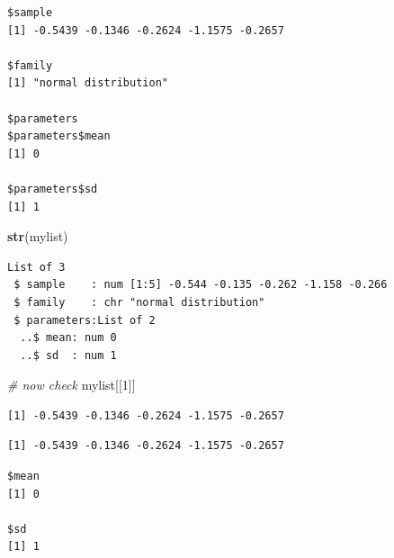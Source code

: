 \documentclass[
]{book}
\newenvironment{Shaded}{\begin{snugshade}}{\end{snugshade}}
\newcommand{\CommentTok}[1]{\textcolor[rgb]{0.56,0.35,0.01}{\textit{#1}}}
\newcommand{\DecValTok}[1]{\textcolor[rgb]{0.00,0.00,0.81}{#1}}
\newcommand{\KeywordTok}[1]{\textcolor[rgb]{0.13,0.29,0.53}{\textbf{#1}}}
\newcommand{\NormalTok}[1]{#1}
\newcommand{\OperatorTok}[1]{\textcolor[rgb]{0.81,0.36,0.00}{\textbf{#1}}}
\begin{document}
\begin{verbatim}
$sample
[1] -0.5439 -0.1346 -0.2624 -1.1575 -0.2657

$family
[1] "normal distribution"

$parameters
$parameters$mean
[1] 0

$parameters$sd
[1] 1
\end{verbatim}

\begin{Shaded}
\begin{Highlighting}[]
\KeywordTok{str}\NormalTok{(mylist)}
\end{Highlighting}
\end{Shaded}

\begin{verbatim}
List of 3
 $ sample    : num [1:5] -0.544 -0.135 -0.262 -1.158 -0.266
 $ family    : chr "normal distribution"
 $ parameters:List of 2
  ..$ mean: num 0
  ..$ sd  : num 1
\end{verbatim}

\begin{Shaded}
\begin{Highlighting}[]
\CommentTok{# now check}
\NormalTok{mylist[[}\DecValTok{1}\NormalTok{]]}
\end{Highlighting}
\end{Shaded}

\begin{verbatim}
[1] -0.5439 -0.1346 -0.2624 -1.1575 -0.2657
\end{verbatim}

\begin{Shaded}
\end{Shaded}

\begin{verbatim}
[1] -0.5439 -0.1346 -0.2624 -1.1575 -0.2657
\end{verbatim}

\begin{Shaded}
\end{Shaded}

\begin{verbatim}
$mean
[1] 0

$sd
[1] 1
\end{verbatim}
\end{document}
